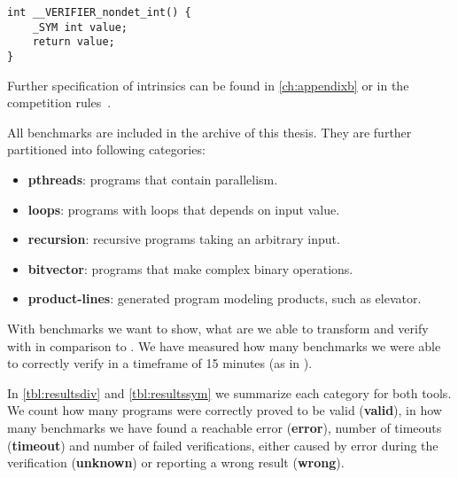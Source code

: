 \begin{verbatim}
int __VERIFIER_nondet_int() {
    _SYM int value;
    return value;
}
\end{verbatim}
Further specification of intrinsics can be found in \autoref{ch:appendixb} or in
the competition rules~\cite{svcomp}.

All benchmarks are included in the archive of this thesis. They are further
partitioned into following categories:
\begin{itemize}
    \item \textbf{pthreads}: programs that contain parallelism.
    \item \textbf{loops}: programs with loops that depends on input value.
    \item \textbf{recursion}: recursive programs taking an arbitrary input.
    \item \textbf{bitvector}: programs that make complex binary operations.
    \item \textbf{product-lines}: generated program modeling products, such as
        elevator.
\end{itemize}

With benchmarks we want to show, what are we able to transform and verify with \DIVINE in comparison to
\SymDIVINE. We have measured how many benchmarks we were able to correctly
verify in a timeframe of 15 minutes (as in \svcomp).

In \autoref{tbl:resultsdiv} and \autoref{tbl:resultssym} we summarize each
category for both tools. We count how many programs were correctly proved to be
valid (\textbf{valid}), in how many benchmarks we have found a reachable error
(\textbf{error}), number of timeouts (\textbf{timeout}) and number of failed
verifications, either caused by error during the verification (\textbf{unknown})
or reporting a wrong result (\textbf{wrong}).

